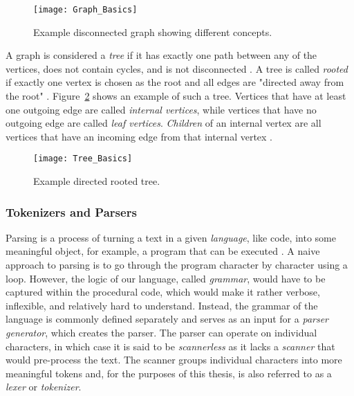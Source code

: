 \begin{figure}[H]
    \centering
    \texttt{[image: Graph\_Basics]}
    \caption{Example disconnected graph showing different concepts.}
    \label{fig:text-graph-basics}
\end{figure}

A graph is considered a \emph{tree} if it has exactly one path between any of the vertices, does not contain cycles, and is not disconnected \parencite{wilson_graph_2009}.
A tree is called \emph{rooted} if exactly one vertex is chosen as the root and all edges are "directed away from the root" \parencite{Baek_trees_2015}.
Figure~\ref{fig:text-tree-basics} shows an example of such a tree.
Vertices that have at least one outgoing edge are called \emph{internal vertices}, while vertices that have no outgoing edge are called \emph{leaf vertices}.
\emph{Children} of an internal vertex are all vertices that have an incoming edge from that internal vertex \parencite{Baek_trees_2015}.

\begin{figure}[H]
    \centering
    \texttt{[image: Tree\_Basics]}
    \caption{Example directed rooted tree.}
    \label{fig:text-tree-basics}
\end{figure}

\subsubsection{Tokenizers and Parsers}

Parsing is a process of turning a text in a given \emph{language}, like code, into some meaningful object, for example, a program that can be executed \parencites{tomassetti_parsing_2017}{Kjolstad_parsing_2023}.
A naive approach to parsing is to go through the program character by character using a loop.
However, the logic of our language, called \emph{grammar}, would have to be captured within the procedural code, which would make it rather verbose, inflexible, and relatively hard to understand.
Instead, the grammar of the language is commonly defined separately and serves as an input for a \emph{parser generator}, which creates the parser.
The parser can operate on individual characters, in which case it is said to be \emph{scannerless} as it lacks a \emph{scanner} that would pre-process the text.
The scanner groups individual characters into more meaningful tokens and, for the purposes of this thesis, is also referred to as a \emph{lexer} or \emph{tokenizer}.

